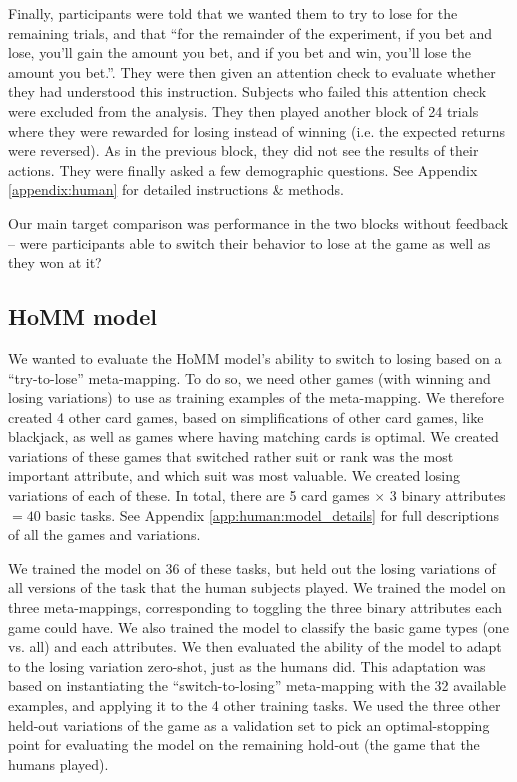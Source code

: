 Finally, participants were told that we wanted them to try to lose for the remaining trials, and that ``for the remainder of the experiment, if you bet and lose, you’ll gain the amount you bet, and if you bet and win, you’ll lose the amount you bet.''. They were then given an attention check to evaluate whether they had understood this instruction. Subjects who failed this attention check were excluded from the analysis. They then played another block of 24 trials where they were rewarded for losing instead of winning (i.e. the expected returns were reversed). As in the previous block, they did not see the results of their actions. They were finally asked a few demographic questions. See Appendix \ref{appendix:human} for detailed instructions \& methods.\par
Our main target comparison was performance in the two blocks without feedback -- were participants able to switch their behavior to lose at the game as well as they won at it?\par

\subsection{HoMM model}

We wanted to evaluate the HoMM model's ability to switch to losing based on a ``try-to-lose'' meta-mapping. To do so, we need other games (with winning and losing variations) to use as training examples of the meta-mapping. We therefore created 4 other card games, based on simplifications of other card games, like blackjack, as well as games where having matching cards is optimal. We created variations of these games that switched rather suit or rank was the most important attribute, and which suit was most valuable. We created losing variations of each of these. In total, there are 5 card games \(\times\) 3 binary attributes \(= 40\) basic tasks. See Appendix \ref{app:human:model_details} for full descriptions of all the games and variations.\par

We trained the model on 36 of these tasks, but held out the losing variations of all versions of the task that the human subjects played. We trained the model on three meta-mappings, corresponding to toggling the three binary attributes each game could have. We also trained the model to classify the basic game types (one vs. all) and each attributes. We then evaluated the ability of the model to adapt to the losing variation zero-shot, just as the humans did. This adaptation was based on instantiating the ``switch-to-losing'' meta-mapping with the 32 available examples, and applying it to the 4 other training tasks. We used the three other held-out variations of the game as a validation set to pick an optimal-stopping point for evaluating the model on the remaining hold-out (the game that the humans played). \par

